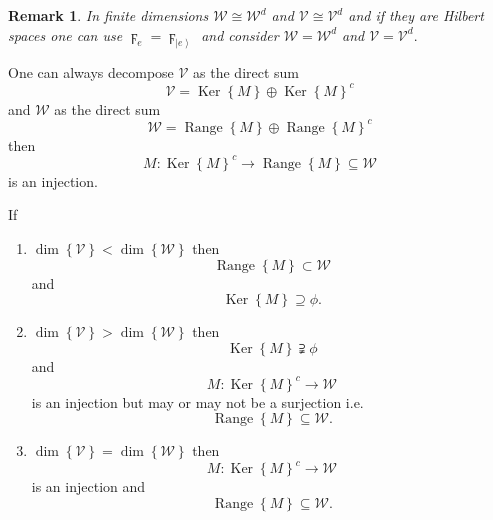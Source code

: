 \documentclass[aps,preprint]{revtex4}%
\newtheorem{remark}[theorem]{Remark}
\begin{document}
\begin{remark}
In finite dimensions $\mathcal{W}\cong\mathcal{W}^{d}$ and $\mathcal{V}%
\cong\mathcal{V}^{d}$ and if they are Hilbert spaces one can use $\digamma
_{e}=\digamma_{\left\vert e\right\rangle }$ and consider $\mathcal{W}%
=\mathcal{W}^{d}$ and $\mathcal{V}=\mathcal{V}^{d}.$
\end{remark}

One can always decompose $\mathcal{V}$ as the direct sum
\begin{equation}
\mathcal{V}=\operatorname{Ker}\left\{  M\right\}  \oplus\operatorname{Ker}%
\left\{  M\right\}  ^{c}%
\end{equation}
and $\mathcal{W}$ as the direct sum
\begin{equation}
\mathcal{W}=\operatorname*{Range}\left\{  M\right\}  \oplus
\operatorname*{Range}\left\{  M\right\}  ^{c}%
\end{equation}
then
\begin{equation}
M:\operatorname{Ker}\left\{  M\right\}  ^{c}\rightarrow\operatorname*{Range}%
\left\{  M\right\}  \subseteq\mathcal{W}%
\end{equation}
is an injection.

If

\begin{enumerate}
\item $\dim\left\{  \mathcal{V}\right\}  <\dim\left\{  \mathcal{W}\right\}  $
then
\begin{equation}
\operatorname*{Range}\left\{  M\right\}  \subset\mathcal{W}%
\end{equation}
and
\begin{equation}
\operatorname{Ker}\left\{  M\right\}  \supseteq\phi.
\end{equation}


\item $\dim\left\{  \mathcal{V}\right\}  >\dim\left\{  \mathcal{W}\right\}  $
then%
\begin{equation}
\operatorname{Ker}\left\{  M\right\}  \supsetneqq\phi
\end{equation}
and
\begin{equation}
M:\operatorname{Ker}\left\{  M\right\}  ^{c}\rightarrow\mathcal{W}%
\end{equation}
is an injection but may or may not be a surjection i.e.
\begin{equation}
\operatorname*{Range}\left\{  M\right\}  \subseteq\mathcal{W}.
\end{equation}


\item $\dim\left\{  \mathcal{V}\right\}  =\dim\left\{  \mathcal{W}\right\}  $
then
\begin{equation}
M:\operatorname{Ker}\left\{  M\right\}  ^{c}\rightarrow\mathcal{W}%
\end{equation}
is an injection and
\begin{equation}
\operatorname*{Range}\left\{  M\right\}  \subseteq\mathcal{W}.
\end{equation}

\end{enumerate}
\end{document}
